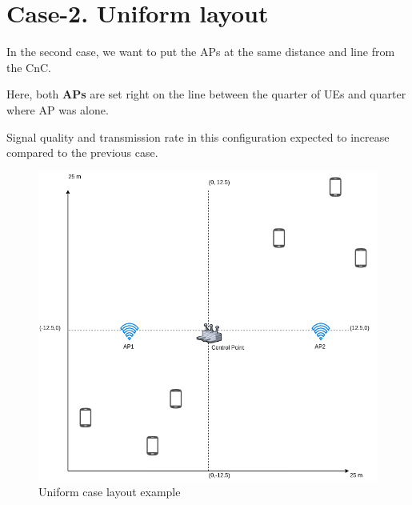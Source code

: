 \hypertarget{case-2.-uniform-layout}{%
\section{Case-2. Uniform layout}\label{case-2.-uniform-layout}}

In the second case, we want to put the APs at the same distance and line
from the CnC.

Here, both \textbf{APs} are set right on the line between the quarter of UEs and quarter where AP was alone.

Signal quality and transmission rate in this configuration expected to increase compared to the previous case.

\begin{figure}[H]
	\centering
	\includegraphics[width=\linewidth,keepaspectratio]{images/05-cases-description-Uniform.png}
\caption{Uniform case layout example}
\end{figure}
